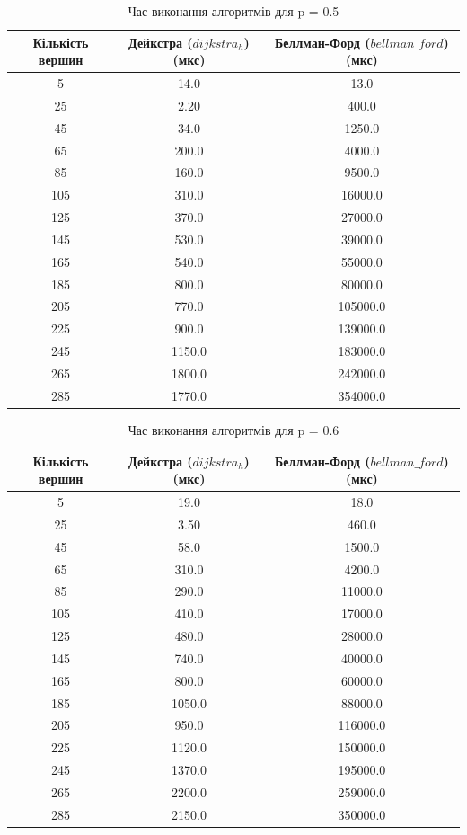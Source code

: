 \documentclass[a4paper,12pt]{article}
\begin{document}
\begin{table}[ht]
    \centering
    \caption{Час виконання алгоритмів для p = 0.5}
    \begin{tabular}{|c|c|c|}
        \hline
        Кількість вершин & Дейкстра ($dijkstra_h$) (мкс) & Беллман-Форд ($bellman\_ford$) (мкс) \\
        \hline
        5   & 14.0    & 13.0 \\
        25  & 2.20    & 400.0 \\
        45  & 34.0    & 1250.0 \\
        65  & 200.0   & 4000.0 \\
        85  & 160.0   & 9500.0 \\
        105 & 310.0   & 16000.0 \\
        125 & 370.0   & 27000.0 \\
        145 & 530.0   & 39000.0 \\
        165 & 540.0   & 55000.0 \\
        185 & 800.0   & 80000.0 \\
        205 & 770.0   & 105000.0 \\
        225 & 900.0   & 139000.0 \\
        245 & 1150.0  & 183000.0 \\
        265 & 1800.0  & 242000.0 \\
        285 & 1770.0  & 354000.0 \\
        \hline
    \end{tabular}
    \label{tab:data_0.5}
\end{table}

\begin{table}[ht]
    \centering
    \caption{Час виконання алгоритмів для p = 0.6}
    \begin{tabular}{|c|c|c|}
        \hline
        Кількість вершин & Дейкстра ($dijkstra_h$) (мкс) & Беллман-Форд ($bellman\_ford$) (мкс) \\
        \hline
        5   & 19.0    & 18.0 \\
        25  & 3.50    & 460.0 \\
        45  & 58.0    & 1500.0 \\
        65  & 310.0   & 4200.0 \\
        85  & 290.0   & 11000.0 \\
        105 & 410.0   & 17000.0 \\
        125 & 480.0   & 28000.0 \\
        145 & 740.0   & 40000.0 \\
        165 & 800.0   & 60000.0 \\
        185 & 1050.0  & 88000.0 \\
        205 & 950.0   & 116000.0 \\
        225 & 1120.0  & 150000.0 \\
        245 & 1370.0  & 195000.0 \\
        265 & 2200.0  & 259000.0 \\
        285 & 2150.0  & 350000.0 \\
        \hline
    \end{tabular}
    \label{tab:data_0.6}
\end{table}
\end{document}
